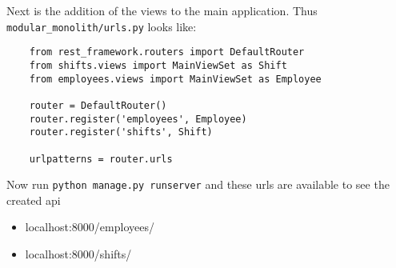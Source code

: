 Next is the addition of the views to the main application. Thus \texttt{modular\_monolith/urls.py} looks like:
\begin{verbatim}
    from rest_framework.routers import DefaultRouter
    from shifts.views import MainViewSet as Shift
    from employees.views import MainViewSet as Employee

    router = DefaultRouter()
    router.register('employees', Employee)
    router.register('shifts', Shift)

    urlpatterns = router.urls
\end{verbatim}

Now run \texttt{python manage.py runserver} and these urls are available to see the created api
\begin{itemize}
  \item localhost:8000/employees/
  \item localhost:8000/shifts/
\end{itemize}
